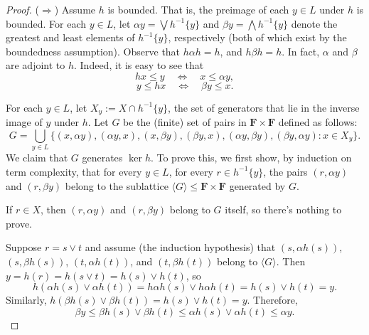 \begin{proof}
($\Rightarrow$) Assume $h$ is bounded.  That is, the preimage of each $y\in L$ under $h$ is bounded.  For each $y\in L$, let $\alpha y= \bigvee h^{-1}\{y\}$ and $\beta y = \bigwedge h^{-1}\{y\}$ denote the greatest and least elements of $h^{-1}\{y\}$, respectively (both of which exist by the boundedness assumption).  Observe that $h \alpha h = h$, and $h \beta h = h$. In fact, $\alpha$ and $\beta$ are adjoint to $h$. Indeed, it is easy to see that
\[
h x \leqslant y \quad \Leftrightarrow \quad x \leqslant \alpha y,
\]
\[
y \leqslant h x \quad \Leftrightarrow \quad \beta y \leqslant x.
\]

For each $y \in L$, let $X_y := X\cap h^{-1}\{y\}$, the set of generators that lie in the inverse image of $y$ under $h$.
Let $G$ be the (finite) set of pairs in $\mathbf F \times \mathbf F$ defined as follows:
\[
G = \bigcup_{y \in L}\{(x, \alpha y), (\alpha y, x), (x, \beta y), (\beta y, x), (\alpha y, \beta y), (\beta y, \alpha y) : x \in X_y\}.
\]
We claim that $G$ generates $\ker h$.  To prove this, we first show, by induction on term complexity, that for every $y \in L$, for every $r \in h^{-1}\{y\}$, the pairs $(r,\alpha y)$ and $(r,\beta y)$ belong to the sublattice $\langle G \rangle \leqslant \mathbf F \times \mathbf F$ generated by $G$.

 If $r \in X$, then $(r,\alpha y)$ and $(r,\beta y)$ belong to $G$ itself, so there's nothing to prove.  

 Suppose $r = s \vee t$  and assume (the induction hypothesis) that
$(s, \alpha {h(s)})$, $(s, \beta{h(s)})$, $(t, \alpha {h(t)})$, and $(t, \beta{h(t)})$ belong to $\langle G \rangle$. Then $y = h (r) = h(s\vee t) = h (s)\vee h(t)$, so 
\[
h(\alpha {h(s)} \vee \alpha {h(t)})= h\alpha h(s) \vee h\alpha h(t)=
h(s) \vee h(t) = y.
\]
Similarly, $h(\beta{h(s)} \vee \beta {h(t)})= h(s) \vee h(t) = y$.
Therefore, 
\[
\beta y \leqslant \beta h(s) \vee \beta h(t) \leqslant \alpha {h(s)} \vee \alpha {h(t)} \leqslant \alpha y.
\]



\end{proof}
